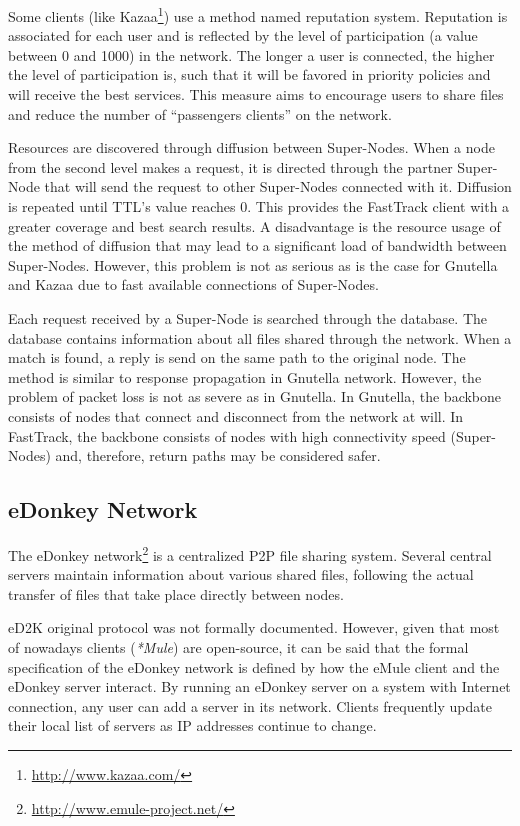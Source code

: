 Some clients (like Kazaa\footnote{\url{http://www.kazaa.com/}}) use a method named reputation system. Reputation is
associated for each user and is reflected by the level of participation (a value
between 0 and 1000) in the network. The longer a user is connected, the higher
the level of participation is, such that it will be favored in priority
policies and will receive the best services. This measure aims to encourage
users to share files and reduce the number of ``passengers clients'' on the
network.

Resources are discovered through diffusion between Super-Nodes. When a node
from the second level makes a request, it is directed through the partner
Super-Node that will send the request to other Super-Nodes connected with it.
Diffusion is repeated until TTL's value reaches 0. This provides the FastTrack
client with a greater coverage and best search results. A disadvantage is the
resource usage of the method of diffusion that may lead to a significant load
of bandwidth between Super-Nodes. However, this problem is not as serious as
is the case for Gnutella and Kazaa due to fast available connections of
Super-Nodes.

Each request received by a Super-Node is searched through the database. The
database contains information about all files shared through the network. When
a match is found, a reply is send on the same path to the original node. The
method is similar to response propagation in Gnutella network. However, the
problem of packet loss is not as severe as in Gnutella. In Gnutella, the
backbone consists of nodes that connect and disconnect from the network at
will. In FastTrack, the backbone consists of nodes with high connectivity
speed (Super-Nodes) and, therefore, return paths may be considered safer.

\subsection{eDonkey Network}

The eDonkey network\footnote{\url{http://www.emule-project.net/}} is a centralized P2P file sharing system. Several central
servers maintain information about various shared files, following the actual
transfer of files that take place directly between nodes.

eD2K original protocol was not formally documented. However, given that most
of nowadays clients (\textit{*Mule}) are open-source, it can be said that the
formal specification of the eDonkey network is defined by how the eMule client and
the eDonkey server interact. By running an eDonkey server on a system with
Internet connection, any user can add a server in its network. Clients
frequently update their local list of servers as IP addresses continue to
change.

